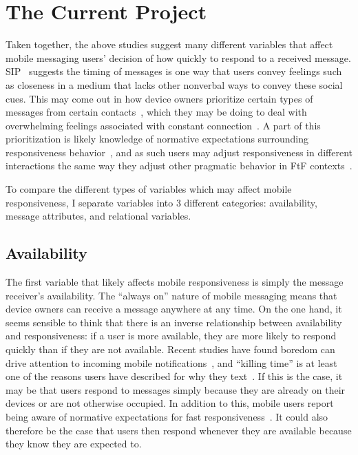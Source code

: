 \documentclass[12pt]{nuthesis}	%
\begin{document}
\chapter{The Current Project}

Taken together, the above studies suggest many different variables that affect mobile messaging users' decision of how quickly to respond to a received message. SIP~\citep{walther1992interpersonal} suggests the timing of messages is one way that users convey feelings such as closeness in a medium that lacks other nonverbal ways to convey these social cues. This may come out in how device owners prioritize certain types of messages from certain contacts~\citep{wohn2015ambient}, which they may be doing to deal with overwhelming feelings associated with constant connection~\citep{ames2013managing}. A part of this prioritization is likely knowledge of normative expectations surrounding responsiveness behavior~\citep{church2013s,rettie2009mobile}, and as such users may adjust responsiveness in different interactions the same way they adjust other pragmatic behavior in FtF contexts~\citep{levinson1981essential}.

To compare the different types of variables which may affect mobile responsiveness, I separate variables into 3 different categories: availability, message attributes, and relational variables.

\section{Availability}

The first variable that likely affects mobile responsiveness is simply the message receiver's availability. The ``always on'' nature of mobile messaging means that device owners can receive a message anywhere at any time. On the one hand, it seems sensible to think that there is an inverse relationship between availability and responsiveness: if a user is more available, they are more likely to respond quickly than if they are not available. Recent studies have found boredom can drive attention to incoming mobile notifications~\citep{pielot2015boredom}, and ``killing time'' is at least one of the reasons users have described for why they text~\citep{battestini2010large}. If this is the case, it may be that users respond to messages simply because they are already on their devices or are not otherwise occupied. In addition to this, mobile users report being aware of normative expectations for fast responsiveness~\citep{church2013s,rettie2009mobile}. It could also therefore be the case that users then respond whenever they are available because they know they are expected to. 
\end{document}
